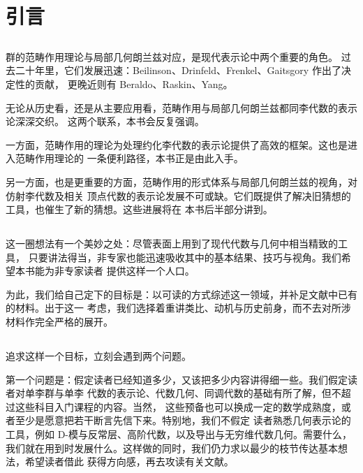 
\section{引言}

\subsection{} 群的范畴作用理论与局部几何朗兰兹对应，是现代表示论中两个重要的角色。
过去二十年里，它们发展迅速：Beilinson、Drinfeld、Frenkel、Gaitsgory 作出了决定性的贡献，
更晚近则有 Beraldo、Raskin、Yang。

无论从历史看，还是从主要应用看，范畴作用与局部几何朗兰兹都同李代数的表示论深深交织。
这两个联系，本书会反复强调。

一方面，范畴作用的理论为处理约化李代数的表示论提供了高效的框架。这也是进入范畴作用理论的
一条便利路径，本书正是由此入手。

另一方面，也是更重要的方面，范畴作用的形式体系与局部几何朗兰兹的视角，对仿射李代数及相关
顶点代数的表示论发展不可或缺。它们既提供了解决旧猜想的工具，也催生了新的猜想。这些进展将在
本书后半部分讲到。

\subsection{} 这一圈想法有一个美妙之处：尽管表面上用到了现代代数与几何中相当精致的工具，
只要讲法得当，非专家也能迅速吸收其中的基本结果、技巧与视角。我们希望本书能为非专家读者
提供这样一个人口。

为此，我们给自己定下的目标是：以可读的方式综述这一领域，并补足文献中已有的材料。出于这一
考虑，我们选择着重讲类比、动机与历史前身，而不去对所涉材料作完全严格的展开。

\subsection{} 追求这样一个目标，立刻会遇到两个问题。

第一个问题是：假定读者已经知道多少，又该把多少内容讲得细一些。我们假定读者对单李群与单李
代数的表示论、代数几何、同调代数的基础有所了解，但不超过这些科目入门课程的内容。当然，
这些预备也可以换成一定的数学成熟度，或者至少是愿意把若干断言先信下来。特别地，我们不假定
读者熟悉几何表示论的工具，例如 D-模与反常层、高阶代数，以及导出与无穷维代数几何。需要什么，
我们就在用到时发展什么。这样做的同时，我们仍力求以最少的枝节传达基本想法，希望读者借此
获得方向感，再去攻读有关文献。

